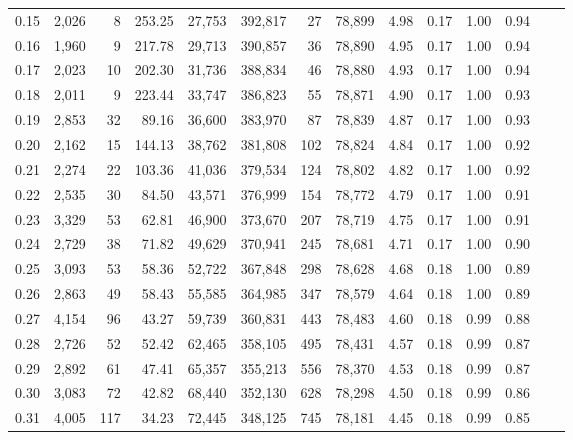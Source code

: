 \begin{tabular}{rrrrrrrrrrrrrr}
0.15 &  2,026 &      8 &   253.25 &   27,753 &  392,817 &      27 &  78,899 &  4.98 &  0.17 &  1.00 &      0.94 \\
0.16 &  1,960 &      9 &   217.78 &   29,713 &  390,857 &      36 &  78,890 &  4.95 &  0.17 &  1.00 &      0.94 \\
0.17 &  2,023 &     10 &   202.30 &   31,736 &  388,834 &      46 &  78,880 &  4.93 &  0.17 &  1.00 &      0.94 \\
0.18 &  2,011 &      9 &   223.44 &   33,747 &  386,823 &      55 &  78,871 &  4.90 &  0.17 &  1.00 &      0.93 \\
0.19 &  2,853 &     32 &    89.16 &   36,600 &  383,970 &      87 &  78,839 &  4.87 &  0.17 &  1.00 &      0.93 \\
0.20 &  2,162 &     15 &   144.13 &   38,762 &  381,808 &     102 &  78,824 &  4.84 &  0.17 &  1.00 &      0.92 \\
0.21 &  2,274 &     22 &   103.36 &   41,036 &  379,534 &     124 &  78,802 &  4.82 &  0.17 &  1.00 &      0.92 \\
0.22 &  2,535 &     30 &    84.50 &   43,571 &  376,999 &     154 &  78,772 &  4.79 &  0.17 &  1.00 &      0.91 \\
0.23 &  3,329 &     53 &    62.81 &   46,900 &  373,670 &     207 &  78,719 &  4.75 &  0.17 &  1.00 &      0.91 \\
0.24 &  2,729 &     38 &    71.82 &   49,629 &  370,941 &     245 &  78,681 &  4.71 &  0.17 &  1.00 &      0.90 \\
0.25 &  3,093 &     53 &    58.36 &   52,722 &  367,848 &     298 &  78,628 &  4.68 &  0.18 &  1.00 &      0.89 \\
0.26 &  2,863 &     49 &    58.43 &   55,585 &  364,985 &     347 &  78,579 &  4.64 &  0.18 &  1.00 &      0.89 \\
0.27 &  4,154 &     96 &    43.27 &   59,739 &  360,831 &     443 &  78,483 &  4.60 &  0.18 &  0.99 &      0.88 \\
0.28 &  2,726 &     52 &    52.42 &   62,465 &  358,105 &     495 &  78,431 &  4.57 &  0.18 &  0.99 &      0.87 \\
0.29 &  2,892 &     61 &    47.41 &   65,357 &  355,213 &     556 &  78,370 &  4.53 &  0.18 &  0.99 &      0.87 \\
0.30 &  3,083 &     72 &    42.82 &   68,440 &  352,130 &     628 &  78,298 &  4.50 &  0.18 &  0.99 &      0.86 \\
0.31 &  4,005 &    117 &    34.23 &   72,445 &  348,125 &     745 &  78,181 &  4.45 &  0.18 &  0.99 &      0.85 \\

\end{tabular}
